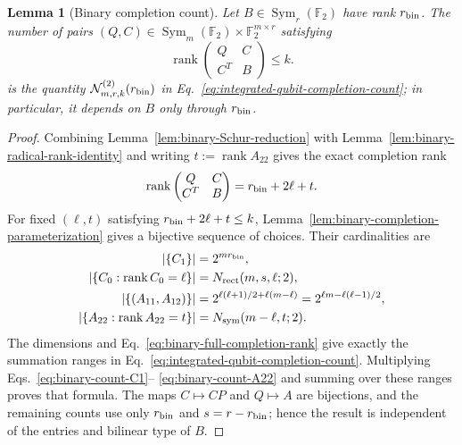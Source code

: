 \documentclass[11pt]{article}
\newcommand{\F}{\mathbb F}
\newcommand{\Sym}{\operatorname{Sym}}
\newcommand{\rank}{\operatorname{rank}}
\newcommand{\1}{\mathbf 1}
\theoremstyle{plain}
\newtheorem{lemma}[theorem]{Lemma}
\theoremstyle{definition}
\theoremstyle{remark}
\begin{document}
\begin{lemma}[Binary completion count]
\label{lem:integrated-binary-completion-count}
Let $B\in\Sym_r(\F_2)$ have rank $r_{\rm bin}$.  The number of pairs
$(Q,C)\in\Sym_m(\F_2)\times\F_2^{m\times r}$ satisfying
\begin{equation}
 \rank\begin{pmatrix}Q&C\\C^T&B\end{pmatrix}\le k.
 \label{eq:integrated-binary-completion-condition}
\end{equation}
is the quantity $\mathcal N_{m,r,k}^{(2)}(r_{\rm bin})$ in
Eq.~\eqref{eq:integrated-qubit-completion-count}; in particular, it depends on
$B$ only through $r_{\rm bin}$.
\end{lemma}
\begin{proof}
Combining Lemma~\ref{lem:binary-Schur-reduction} with
Lemma~\ref{lem:binary-radical-rank-identity} and writing
$t:=\rank A_{22}$ gives the exact completion rank
\begin{equation}
 \rank\begin{pmatrix}Q&C\\C^T&B\end{pmatrix}
 =r_{\rm bin}+2\ell+t.
 \label{eq:binary-full-completion-rank}
\end{equation}
For fixed $(\ell,t)$ satisfying $r_{\rm bin}+2\ell+t\le k$,
Lemma~\ref{lem:binary-completion-parameterization} gives a bijective sequence
of choices.  Their cardinalities are
\begin{align}
 |\{C_1\}|&=2^{mr_{\rm bin}},
 \label{eq:binary-count-C1}\\
 |\{C_0:\rank C_0=\ell\}|&=N_{\rm rect}(m,s,\ell;2),
 \label{eq:binary-count-C0}\\
 |\{(A_{11},A_{12})\}|
 &=2^{\ell(\ell+1)/2+\ell(m-\ell)}
 =2^{\ell m-\ell(\ell-1)/2},
 \label{eq:binary-count-free-A}\\
 |\{A_{22}:\rank A_{22}=t\}|
 &=N_{\rm sym}(m-\ell,t;2).
 \label{eq:binary-count-A22}
\end{align}
The dimensions and Eq.~\eqref{eq:binary-full-completion-rank} give exactly the
summation ranges in Eq.~\eqref{eq:integrated-qubit-completion-count}.
Multiplying Eqs.~\eqref{eq:binary-count-C1}--
\eqref{eq:binary-count-A22} and summing over these ranges proves that formula.
The maps $C\mapsto CP$ and $Q\mapsto A$ are bijections, and the remaining
counts use only $r_{\rm bin}$ and $s=r-r_{\rm bin}$; hence the result is
independent of the entries and bilinear type of $B$.
\end{proof}
\end{document}
